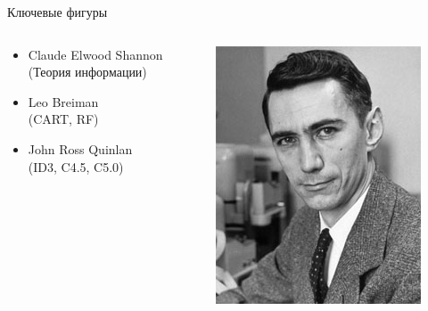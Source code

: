 \documentclass[10pt]{beamer}
\begin{document}

\begin{frame}{Ключевые фигуры}

\begin{columns}[T]
    \begin{column}{.5\textwidth}
    	\vspace{5em}
    	\begin{itemize}
			\item Claude Elwood Shannon \\ (Теория информации)
			\item Leo Breiman \\ (CART, RF)
			\item John Ross Quinlan  \\ (ID3, C4.5, C5.0)
		\end{itemize}        
    \end{column}
    \begin{column}{.5\textwidth}
    \begin{center}
    	\includegraphics[scale=0.3]{images/shannon.jpg}\, 	   

\end{center}
\end{column}
\end{columns}
\end{frame}
\end{document}
